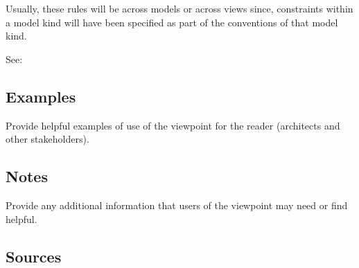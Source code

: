 
Usually, these rules will be across models or across views since,
constraints within a model kind will have been specified as part of
the conventions of that model kind.

See: 


\subsection{Examples \Optional} 

Provide helpful examples of use of the viewpoint for the reader
(architects and other stakeholders).


\subsection{Notes \Optional} 

Provide any additional information that users of the viewpoint may
need or find helpful.


\subsection{Sources} 


